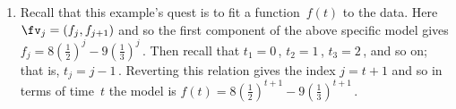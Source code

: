\begin{example}
\begin{solution}
\begin{enumerate}
\item\label{eg:2expfite}
Recall that this example's quest is to fit a function~\(f(t)\) to the data.
Here \(\fv_j=(f_j,f_{j+1})\) and so the first component of the above specific model gives \(f_j=8(\frac12)^j -9(\frac13)^j\)\,.
Then recall that \(t_1=0\)\,, \(t_2=1\)\,, \(t_3=2\)\,, and so on; 
that is, \(t_j=j-1\)\,.
Reverting this relation gives the index \(j=t+1\) and so in terms of time~\(t\) the model is \(f(t)=8(\frac12)^{t+1} -9(\frac13)^{t+1}\)\,.
\end{enumerate}
%

\end{solution}
\end{example}

